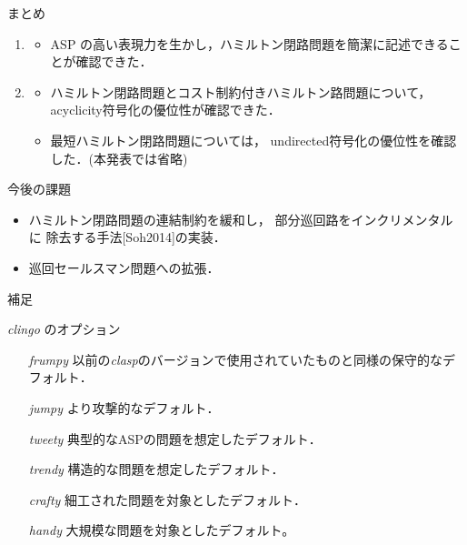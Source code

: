 \documentclass[dvipdfmx,10pt]{beamer}
\begin{document}
\begin{frame}{まとめ}
    \begin{enumerate}
    \item {}
      \begin{itemize}
      \item ASP の高い表現力を生かし，ハミルトン閉路問題を簡潔に記述できることが確認できた．
      \end{itemize}
    \item {}
      \begin{itemize}
      \item ハミルトン閉路問題とコスト制約付きハミルトン路問題について，
        \textsf{acyclicity}符号化の優位性が確認できた．
      \item 最短ハミルトン閉路問題については，
        \textsf{undirected}符号化の優位性を確認した．(本発表では省略)
      \end{itemize}
    \end{enumerate}
  \begin{alertblock}{今後の課題}
    \begin{itemize}
    \item ハミルトン閉路問題の連結制約を緩和し，
      部分巡回路をインクリメンタルに
      除去する手法[Soh2014]の実装．
    \item 巡回セールスマン問題への拡張．
    \end{itemize}
  \end{alertblock}
\end{frame}


\begin{frame}[noframenumbering]{}
  補足
\end{frame}

\begin{frame}[noframenumbering]{\textit{clingo} のオプション}
   \begin{itemize}
     \item [\textit{frumpy}] 以前の\textit{clasp}のバージョンで使用されていたものと同様の保守的なデフォルト．
     \item [\textit{jumpy}] より攻撃的なデフォルト．
     \item [\textit{tweety}] 典型的なASPの問題を想定したデフォルト．
     \item [\textit{trendy}] 構造的な問題を想定したデフォルト．
     \item [\textit{crafty}] 細工された問題を対象としたデフォルト．
     \item [\textit{handy}] 大規模な問題を対象としたデフォルト。
   \end{itemize}
\end{frame}
\end{document}
